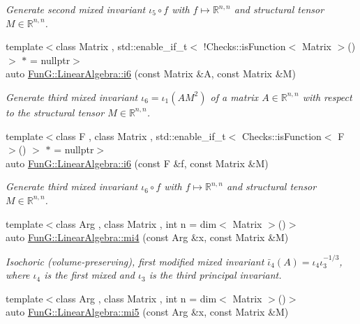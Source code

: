 \begin{DoxyCompactItemize}
\begin{DoxyCompactList}\small\item\em Generate second mixed invariant $ \iota_5\circ f $ with $f\mapsto\mathbb{R}^{n,n}$ and structural tensor $M\in\mathbb{R}^{n,n}$. \end{DoxyCompactList}\item 
{\footnotesize template$<$class Matrix , std\+::enable\+\_\+if\+\_\+t$<$ !\+Checks\+::is\+Function$<$ Matrix $>$() $>$ $\ast$  = nullptr$>$ }\\auto \hyperlink{group__InvariantGroup_gad9f0627946667bb052212f65ecdd002b}{Fun\+G\+::\+Linear\+Algebra\+::i6} (const Matrix \&A, const Matrix \&M)
\begin{DoxyCompactList}\small\item\em Generate third mixed invariant $ \iota_6=\iota_1(AM^2) $ of a matrix $A\in\mathbb{R}^{n,n}$ with respect to the structural tensor $M\in\mathbb{R}^{n,n}$. \end{DoxyCompactList}\item 
{\footnotesize template$<$class F , class Matrix , std\+::enable\+\_\+if\+\_\+t$<$ Checks\+::is\+Function$<$ F $>$() $>$ $\ast$  = nullptr$>$ }\\auto \hyperlink{group__InvariantGroup_ga2536c80df733bb3e089487202c3688c1}{Fun\+G\+::\+Linear\+Algebra\+::i6} (const F \&f, const Matrix \&M)
\begin{DoxyCompactList}\small\item\em Generate third mixed invariant $ \iota_6\circ f $ with $f\mapsto\mathbb{R}^{n,n}$ and structural tensor $M\in\mathbb{R}^{n,n}$. \end{DoxyCompactList}\item 
{\footnotesize template$<$class Arg , class Matrix , int n = dim$<$ Matrix $>$()$>$ }\\auto \hyperlink{group__InvariantGroup_ga7ee54c5d056877bdefefb8e54ad17791}{Fun\+G\+::\+Linear\+Algebra\+::mi4} (const Arg \&x, const Matrix \&M)
\begin{DoxyCompactList}\small\item\em Isochoric (volume-\/preserving), first modified mixed invariant $ \bar\iota_4(A)=\iota_4\iota_3^{-1/3} $, where $\iota_4$ is the first mixed and $\iota_3$ is the third principal invariant. \end{DoxyCompactList}\item 
{\footnotesize template$<$class Arg , class Matrix , int n = dim$<$ Matrix $>$()$>$ }\\auto \hyperlink{group__InvariantGroup_ga189bc682b34d13902da335c5eb502faa}{Fun\+G\+::\+Linear\+Algebra\+::mi5} (const Arg \&x, const Matrix \&M)

\end{DoxyCompactItemize}
